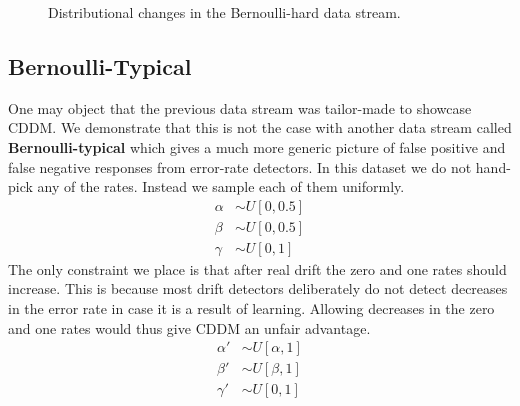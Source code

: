 \begin{figure}
    \centering
    \caption{Distributional changes in the Bernoulli-hard data stream.}
    \label{fig:bernoulli_hard}
\end{figure}

\subsection{Bernoulli-Typical}

One may object that the previous data stream was tailor-made to showcase CDDM. We demonstrate that this is not the case with another data stream called {\bf Bernoulli-typical} which gives a much more generic picture of false positive and false negative responses from error-rate detectors. In this dataset we do not hand-pick any of the rates. Instead we sample each of them uniformly.
\begin{align}
  \alpha &\sim U[0, 0.5] \\
  \beta &\sim U[0, 0.5] \\
  \gamma &\sim U[0, 1]
\end{align}
The only constraint we place is that after real drift the zero and one rates should increase. This is because most drift detectors deliberately do not detect decreases in the error rate in case it is a result of learning. Allowing decreases in the zero and one rates would thus give CDDM an unfair advantage.
\begin{align}
  \alpha' &\sim U[\alpha, 1] \\
  \beta' &\sim U[\beta, 1] \\
  \gamma' &\sim U[0, 1]
\end{align}

